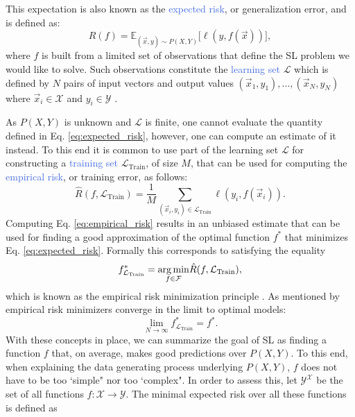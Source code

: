 This expectation is also known as the \textcolor{RoyalBlue}{expected risk}, or generalization error, and is defined as:
\begin{equation}
	R(f) = \mathds{E}_{(\vec{x},y)\sim P(X,Y)} \big[\ell(y,f(\vec{x}))\big],
\label{eq:expected_risk}
\end{equation}
where $f$ is built from a limited set of observations that define the SL problem we would like to solve. Such observations constitute the \textcolor{RoyalBlue}{learning set} $\mathcal{L}$ which is defined by $N$ pairs of input vectors and output values $(\vec{x}_1, y_1),...,(\vec{x}_N, y_N)$ where $\vec{x}_i \in \mathcal{X}$ and $y_i \in \mathcal{Y}$ \cite{geurts2002contributions}. 

As $P(X,Y)$ is unknown and $\mathcal{L}$ is finite, one cannot evaluate the quantity defined in Eq. \ref{eq:expected_risk}, however, one can compute an estimate of it instead. To this end it is common to use part of the learning set $\mathcal{L}$ for constructing a \textcolor{RoyalBlue}{training set} $\mathcal{L}_{\text{Train}}$, of size $M$, that can be used for computing the \textcolor{RoyalBlue}{empirical risk}, or training error, as follows:
\begin{equation}
	\hat{R}(f,\mathcal{L}_\text{Train}) = \frac{1}{M} \sum_{(\vec{x}_i, y_i)\in \mathcal{L}_{\text{Train}}} \ell(y_i,f(\vec{x}_i)).
\label{eq:empirical_risk}
\end{equation}
Computing Eq. \ref{eq:empirical_risk} results in an unbiased estimate that can be used for finding a good approximation of the optimal function $f^{*}$ that minimizes Eq. \ref{eq:expected_risk}. Formally this corresponds to satisfying the equality
\begin{equation}
	f^{*}_{\mathcal{L}_{\text{Train}}} = \underset{f\in\mathcal{F}}{\operatorname*{arg\,min}}\hat{R}(f,\mathcal{L}_{\text{Train}}),
\end{equation}
which is known as the empirical risk minimization principle \cite{vapnik1992principles}. As mentioned by \citet{vapnik2015uniform} empirical risk minimizers converge in the limit to optimal models:
\begin{equation}
	\lim_{N \to \infty} f^{*}_{\mathcal{L}_\text{Train}} = f^{*}.
\end{equation}
With these concepts in place, we can summarize the goal of SL as finding a function $f$ that, on average, makes good predictions over $P(X,Y)$. To this end, when explaining the data generating process underlying $P(X,Y)$, $f$ does not have to be too `simple" nor too `complex". In order to assess this, let $\mathcal{Y}^{\mathcal{X}}$ be the set of all functions $f:\mathcal{X}\rightarrow\mathcal{Y}$. The minimal expected risk over all these functions is defined as
